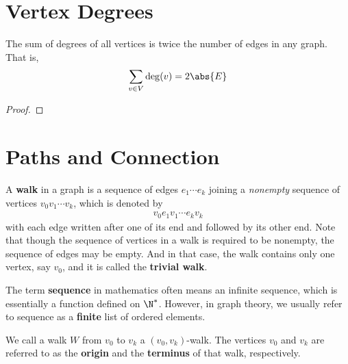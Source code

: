 \documentclass[thmcnt=section, 12pt, color=cyan]{my-elegantbook}
\begin{document}

\section{Vertex Degrees}


\begin{theorem} \label{thm:5}
	The sum of degrees of all vertices
	is twice the number of edges in any graph.
	That is, 
	\begin{align*}
		\sum_{v \in V} \deg(v) = 2 \abs{E}
	\end{align*}
\end{theorem}

\begin{proof}
\end{proof}



\section{Paths and Connection}


A \textbf{walk} in a graph is a sequence of edges $e_1 \cdots e_k$ joining a \textit{nonempty} sequence of vertices $v_0 v_1 \cdots v_k$, which is denoted by 
\begin{align}
    v_0 e_1 v_1 \cdots e_k v_k 
    \label{eq:3}
\end{align}
with each edge written after one of its end and followed by its other end. Note that though the sequence of vertices in a walk is required to be nonempty, the sequence of edges may be empty. And in that case, the walk contains only one vertex, say $v_0$, and it is called the \textbf{trivial walk}.
\begin{note}
    The term \textbf{sequence} in mathematics often means an infinite sequence, which is essentially a function defined on $\N^\ast$. However, in graph theory, we usually refer to sequence as a \textbf{finite} list of ordered elements.
\end{note}

We call a walk $W$ from $v_0$ to $v_k$ a $(v_0, v_k)$-walk. The vertices $v_0$ and $v_k$ are referred to as the \textbf{origin} and the \textbf{terminus} of that walk, respectively. 
\end{document}
